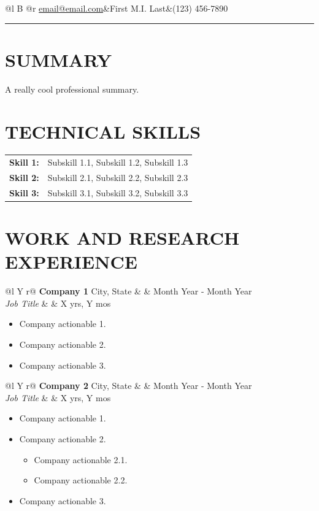 \documentclass[a4paper,11pt]{article}
\makeatletter
\newcommand{\fullwidthrule}[2]
{%
	\noindent
	\hspace*{-\dimexpr1in+\hoffset+\oddsidemargin-#1\relax}%
	\rule{\dimexpr\paperwidth-2\dimexpr#1\relax\relax}{#2}%
}
\newenvironment{job}[5]
{%
	\vspace{2pt}
	\begin{tabularx}{\linewidth}{@{}l Y r@{}}
		\textbf{#1 \textbar} #2 & \hfill &  #3 \\
		\textit{#4} & \hfill &  #5\\
	\end{tabularx}
	\begin{itemize}
}
{%
	\end{itemize}
}
\makeatother
\begin{document}
	\begin{tabularx}{\linewidth}{@{}l B @{}r}
		\href{mailto:email@email.com}{email@email.com}&First M.I. Last&(123) 456-7890 
	\end{tabularx}
	\fullwidthrule{10pt}{2pt}
	
	\section{SUMMARY}
	A really cool professional summary.
	
	\section{TECHNICAL SKILLS}
	\begin{tabularx}{\linewidth}{@{} >{\bfseries}l X@{}}
		Skill 1:	& Subskill 1.1, Subskill 1.2, Subskill 1.3\\
		Skill 2:	& Subskill 2.1, Subskill 2.2, Subskill 2.3\\
		Skill 3:	& Subskill 3.1, Subskill 3.2, Subskill 3.3\\
	\end{tabularx}
	
	\section{WORK AND RESEARCH EXPERIENCE}
	\begin{job}{Company 1}{City, State}{Month Year - Month Year}{Job Title}{X yrs, Y mos}
		\item Company actionable 1.
		\item Company actionable 2.
		\item Company actionable 3.
	\end{job}
	\begin{job}{Company 2}{City, State}{Month Year - Month Year}{Job Title}{X yrs, Y mos}
		\item Company actionable 1.
		\item Company actionable 2.
		\begin{itemize}
			\item Company actionable 2.1.
			\item Company actionable 2.2.
		\end{itemize}
		\item Company actionable 3.
	\end{job}
	
\end{document}
